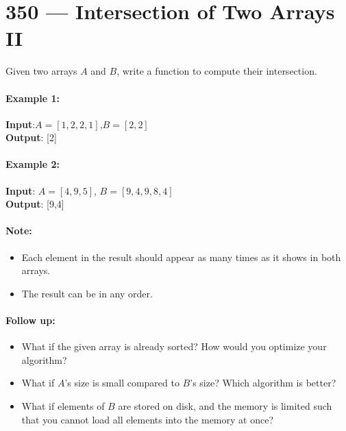 \section{350 --- Intersection of Two Arrays II}
Given two arrays $ A $ and $ B $, write a function to compute their intersection.

\paragraph{Example 1:}

\begin{flushleft}
\textbf{Input}:$  A = [1,2,2,1] $,$  B = [2,2] $
\\
\textbf{Output}: [2]
\end{flushleft}


\paragraph{Example 2:}

\begin{flushleft}
\textbf{Input}: $ A = [4,9,5] $, $ B = [9,4,9,8,4] $
\\
\textbf{Output}: [9,4]
\end{flushleft}

\paragraph{Note:}

\begin{itemize}
\item Each element in the result should appear as many times as it shows in both arrays.
\item The result can be in any order.
\end{itemize}

\paragraph{Follow up:}

\begin{itemize}
\item What if the given array is already sorted? How would you optimize your algorithm?
\item What if $ A $'s size is small compared to $ B $'s size? Which algorithm is better?
\item What if elements of $ B $ are stored on disk, and the memory is limited such that you cannot load all elements into the memory at once?
\end{itemize}

